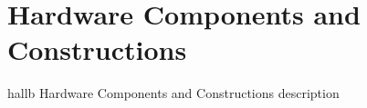 \section{Hardware Components and Constructions}

hallb Hardware Components and Constructions description

